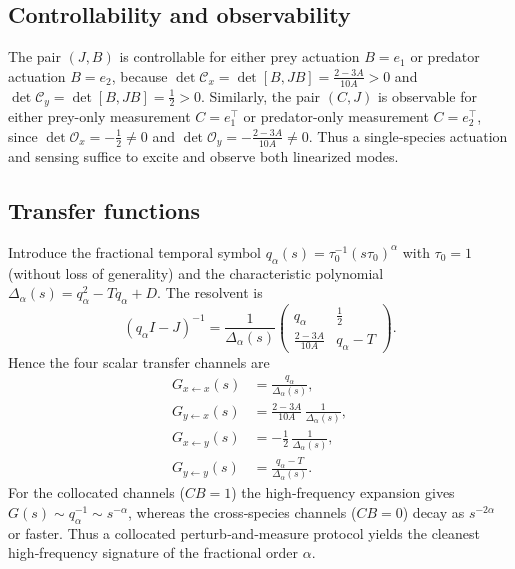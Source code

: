 \subsection{Controllability and observability}
The pair \((J,B)\) is controllable for either prey actuation
\(B=e_1\) or predator actuation \(B=e_2\), because
\(\det\mathcal C_x = \det[B,JB] = \frac{2-3A}{10A}>0\) and
\(\det\mathcal C_y = \det[B,JB] = \frac12>0\).  
Similarly, the pair \((C,J)\) is observable for either prey-only
measurement \(C=e_1^\top\) or predator-only measurement
\(C=e_2^\top\), since \(\det\mathcal O_x = -\frac12\neq0\) and
\(\det\mathcal O_y = -\frac{2-3A}{10A}\neq0\).  
Thus a single‑species actuation and sensing suffice to excite and
observe both linearized modes.

\subsection{Transfer functions}
Introduce the fractional temporal symbol
\(q_\alpha(s)=\tau_0^{-1}(s\tau_0)^\alpha\) with \(\tau_0=1\) (without loss of
generality) and the characteristic polynomial
\(\Delta_\alpha(s)=q_\alpha^2 - T q_\alpha + D\).
The resolvent is
\[
(q_\alpha I-J)^{-1}
=\frac{1}{\Delta_\alpha(s)}
\begin{pmatrix}
q_\alpha & \frac12 \\[0.5ex]
\frac{2-3A}{10A} & q_\alpha-T
\end{pmatrix}.
\]
Hence the four scalar transfer channels are
\begin{align}
G_{x\leftarrow x}(s)&=\frac{q_\alpha}{\Delta_\alpha(s)},\label{eq:Gxx}\\
G_{y\leftarrow x}(s)&=\frac{2-3A}{10A}\,\frac{1}{\Delta_\alpha(s)},\label{eq:Gyx}\\
G_{x\leftarrow y}(s)&=-\frac12\,\frac{1}{\Delta_\alpha(s)},\label{eq:Gxy}\\
G_{y\leftarrow y}(s)&=\frac{q_\alpha-T}{\Delta_\alpha(s)}.\label{eq:Gyy}
\end{align}
For the collocated channels (\(CB=1\)) the high‑frequency expansion gives
\(G(s)\sim q_\alpha^{-1}\sim s^{-\alpha}\), whereas the cross‑species
channels (\(CB=0\)) decay as \(s^{-2\alpha}\) or faster.  
Thus a collocated perturb‑and‑measure protocol yields the cleanest
high‑frequency signature of the fractional order \(\alpha\).

